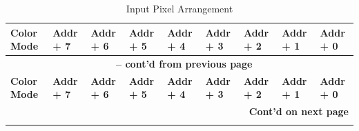 \documentclass[main\_\_EN.tex]{subfiles}
\begin{document}
\scriptsize
\begin{longtable}[c]{ |p{2cm}|p{1.5cm}|p{1.5cm}|p{1.5cm}|p{1.5cm}|p{1.5cm}|p{1.5cm}|p{1.5cm}|p{1.5cm}| }
    \caption{Input Pixel Arrangement}
    \label{tab:input-pixel-arrangement}\\\hline

    \rowcolor{lightgray}
    \textbf{Color Mode} & \textbf{Addr + 7} & \textbf{Addr + 6} & \textbf{Addr + 5} & \textbf{Addr + 4} & \textbf{Addr + 3} & \textbf{Addr + 2} & \textbf{Addr + 1} & \textbf{Addr + 0} \\\hline
    \endfirsthead


    \multicolumn{9}{c}{\bfseries \tablename\ \thetable{} -- cont'd from previous page}\\\hline
    \rowcolor{lightgray}
    \textbf{Color Mode} & \textbf{Addr + 7} & \textbf{Addr + 6} & \textbf{Addr + 5} & \textbf{Addr + 4} & \textbf{Addr + 3} & \textbf{Addr + 2} & \textbf{Addr + 1} & \textbf{Addr + 0} \\\hline
    \endhead

    \multicolumn{9}{r}{\textbf{Cont'd on next page}} \\
    \endfoot


\end{longtable}
\end{document}
